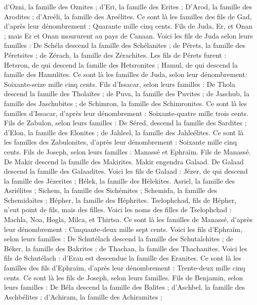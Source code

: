\begin{multicols}{2}
d'Ozni, la famille des Oznites ; d’Eri, la famille des Erites ;
D'Arod, la famille des Arodites ; d'Areéli, la famille des Areélites.
Ce sont là les familles des fils de Gad, d’après leur dénombrement : Quarante mille cinq cents.
Fils de Juda, Er, et Onan ; mais Er et Onan moururent au pays de Canaan.
Voici les fils de Juda selon leurs familles : De Schéla descend la famille des Schélanites ; de Pérets, la famille des Péretsites ; de Zérach, la famille des Zérachites.
Les fils de Pérets furent : Hetsron, de qui descend la famille des Hetsronites ; Hamul, de qui descend la famille des Hamulites.
Ce sont là les familles de Juda, selon leur dénombrement: Soixante-seize mille cinq cents.
Fils d'Issacar, selon leurs familles : De Thola descend la famille des Tholaïtes ; de Puva, la famille des Puvites ;
de Jaschub, la famille des Jaschubites ; de Schimron, la famille des Schimronites.
Ce sont là les familles d'Issacar, d’après leur dénombrement : Soixante-quatre mille trois cents.
Fils de Zabulon, selon leurs familles : De Séred, descend la famille des Sardites ; d'Elon, la famille des Elonites ; de Jahleel, la famille des Jahleélites.
Ce sont là les familles des Zabulonites, d’après leur dénombrement : Soixante mille cinq cents.
Fils de Joseph, selon leurs familles : Manassé et Ephraïm.
Fils de Manassé. De Makir descend la famille des Makirites. Makir engendra Galaad. De Galaad descend la famille des Galaadites.
Voici les fils de Galaad : Jézer, de qui descend la famille des Jézerites ; Hélek, la famille des Hélekites.
Asriel, la famille des Asriélites ; Sichem, la famille des Sichémites ;
Schemida, la famille des Schemidaïtes ; Hépher, la famille des Héphrites.
Tselophchad, fils de Hépher, n'eut point de fils, mais des filles. Voici les noms des filles de Tselophchad : Machla, Noa, Hogla, Milca, et Thirtsa.
Ce sont là les familles de Manassé, d’après leur dénombrement : Cinquante-deux mille sept cents.
Voici les fils d'Ephraïm, selon leurs familles : De Schutélach descend la famille des Schutalchites ; de Béker, la famille des Bakrites ; de Thachan, la famille des Thachanites.
Voici les fils de Schutélach : d’Eran est descendue la famille des Eranites.
Ce sont là les familles des fils d'Ephraïm, d’après leur dénombrement : Trente-deux mille cinq cents. Ce sont là les fils de Joseph, selon leurs familles.
Fils de Benjamin, selon leurs familles : De Béla descend la famille des Balites ; d'Aschbel, la famille des Aschbélites ; d'Achiram, la famille des Achiramites ;

\end{multicols}
